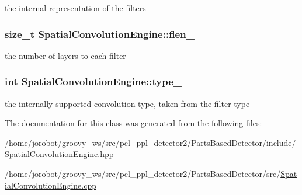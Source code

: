 the internal representation of the filters 

\hypertarget{classSpatialConvolutionEngine_a5d58b30ec6846ef7ccf98f980d4fc957}{
\subsubsection[{flen\-\_\-}]{\setlength{\rightskip}{0pt plus 5cm}size\-\_\-t {\bf \-Spatial\-Convolution\-Engine\-::flen\-\_\-}}}\label{classSpatialConvolutionEngine_a5d58b30ec6846ef7ccf98f980d4fc957}


the number of layers to each filter 

\hypertarget{classSpatialConvolutionEngine_a913adab567840b6d1b2407c3b22ca108}{
\subsubsection[{type\-\_\-}]{\setlength{\rightskip}{0pt plus 5cm}int {\bf \-Spatial\-Convolution\-Engine\-::type\-\_\-}}}\label{classSpatialConvolutionEngine_a913adab567840b6d1b2407c3b22ca108}


the internally supported convolution type, taken from the filter type 



\-The documentation for this class was generated from the following files\-:\begin{DoxyCompactItemize}
\item 
/home/jorobot/groovy\-\_\-ws/src/pcl\-\_\-ppl\-\_\-detector2/\-Parts\-Based\-Detector/include/\hyperlink{SpatialConvolutionEngine_8hpp}{\-Spatial\-Convolution\-Engine.\-hpp}\item 
/home/jorobot/groovy\-\_\-ws/src/pcl\-\_\-ppl\-\_\-detector2/\-Parts\-Based\-Detector/src/\hyperlink{SpatialConvolutionEngine_8cpp}{\-Spatial\-Convolution\-Engine.\-cpp}\end{DoxyCompactItemize}
